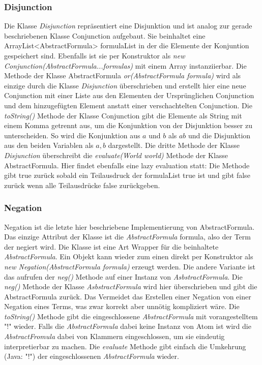\documentclass[12pt,a4paper]{article}
\begin{document}
\subsubsection{Disjunction}


Die Klasse \textit{Disjunction} repräsentiert eine Disjunktion und ist analog zur gerade beschriebenen Klasse Conjunction aufgebaut. Sie beinhaltet eine ArrayList<AbstractFormula> formulaList in der die Elemente der Konjuntion gespeichert sind. Ebenfalls ist sie per Konstruktor als \textit{new Conjunction(AbstractFormula...formulas)}  mit einem Array instanziierbar. Die Methode der Klasse AbstractFormula \textit{or(AbstractFormula formula)} wird als einzige durch die Klasse \textit{Disjunction} überschrieben und erstellt hier eine neue Conjunction mit einer Liste aus den Elementen der Ursprünglichen Conjunction und dem hinzugefügten Element anstatt einer verschachtelten Conjunction. Die \textit{toString()} Methode der Klasse Conjunction gibt die Elemente als String mit einem Komma getrennt aus, um die Konjunktion von der Disjunktion besser zu unterscheiden. So wird die Konjunktion aus $a$ und $b$ als $ab$ und die Disjunktion aus den beiden Variablen als $a,b$ dargestellt. Die dritte Methode der Klasse \textit{Disjunction} überschreibt die \textit{evaluate(World world)} Methode der Klasse AbstractFormula. Hier findet ebenfalls eine lazy evaluation statt: Die Methode gibt true zurück sobald ein Teilausdruck der formulaList true ist und gibt false zurück wenn alle Teilausdrücke false zurückgeben.


\subsubsection{Negation}


Negation ist die letzte hier beschriebene Implementierung von AbstractFormula. Das einzige Attribut der Klasse ist die \textit{AbstractFormula} formula, also der Term der negiert wird. Die Klasse ist eine Art Wrapper für die beinhaltete \textit{AbstractFormula}. Ein Objekt kann wieder zum einen direkt per Konstruktor als \textit{new Negation(AbstractFormula formula)} erzeugt werden. Die andere Variante ist das aufrufen der \textit{neg()} Methode auf einer Instanz von \textit{AsbstractFormula}. Die \textit{neg()} Methode der Klasse \textit{AsbstractFormula} wird hier überschrieben und gibt die AbstractFormula zurück. Das Vermeidet das Erstellen einer Negation von einer Negation eines Terms, was zwar korrekt aber unnötig kompliziert wäre. Die \textit{toString()} Methode gibt die eingeschlossene \textit{AbstractFormula} mit vorangestelltem "!" wieder. Falls die \textit{AbstractFormula} dabei keine Instanz von Atom ist wird die \textit{AbstractFromula} dabei von Klammern eingeschlossen, um sie eindeutig interpretierbar zu machen. Die \textit{evaluate} Methode gibt einfach die Umkehrung (Java: "!") der eingeschlossenen \textit{AbstractFormula} wieder.
\end{document}
